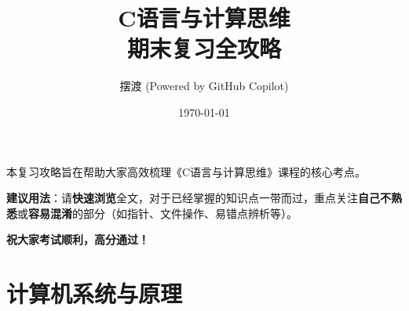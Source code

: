 \documentclass[a4paper,12pt]{article}
\title{\textbf{\Huge C语言与计算思维\\期末复习全攻略}}
\author{\Large 摆渡 (Powered by GitHub Copilot)}
\date{\today}
\begin{document}
\maketitle
\thispagestyle{empty} %

\begin{center}
    \begin{tcolorbox}[colback=green!5!white,colframe=green!50!black,title=使用建议,fonttitle=\bfseries]
        本复习攻略旨在帮助大家高效梳理《C语言与计算思维》课程的核心考点。
        
        \textbf{建议用法}：请\textbf{快速浏览}全文，对于已经掌握的知识点一带而过，重点关注\textbf{自己不熟悉}或\textbf{容易混淆}的部分（如指针、文件操作、易错点辨析等）。
        
        \vspace{0.5em}
        \centering\textbf{\large 祝大家考试顺利，高分通过！}
    \end{tcolorbox}
\end{center}

\newpage
\tableofcontents
\newpage

\section{计算机系统与原理}
\end{document}
